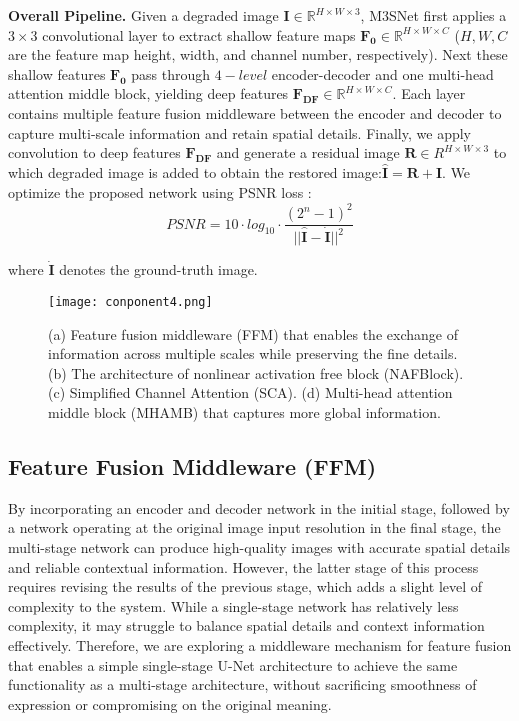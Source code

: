 \documentclass[sn-mathphys,Numbered]{sn-jnl}
\theoremstyle{thmstyleone}\newtheorem{theorem}{Theorem}\newtheorem{proposition}[theorem]{Proposition}
\theoremstyle{thmstyletwo}\newtheorem{example}{Example}\newtheorem{remark}{Remark}
\theoremstyle{thmstylethree}\newtheorem{definition}{Definition}
\begin{document}
\noindent\textbf{Overall Pipeline.} Given a degraded image $\mathbf{I} \in \mathbb R^{H \times W \times 3}$, M3SNet first applies a $3 \times 3$ convolutional layer to extract shallow feature maps $\mathbf{F_{0}} \in \mathbb R^{H \times W \times C}$ ($H, W, C$ are the feature map height, width, and channel number, respectively). Next these shallow features $\mathbf{F_{0}}$ pass through $4-level$ encoder-decoder and one multi-head attention middle block, yielding deep features $\mathbf{F_{DF}} \in \mathbb R^{H \times W \times C}$. Each layer contains multiple feature fusion middleware between the encoder and decoder to capture multi-scale information and retain spatial details. 
Finally, we apply convolution to deep  features $\mathbf{F_{DF}}$ and generate a residual image $\mathbf{R}\in  R^{H \times W \times 3}$ to which degraded image is added to obtain the restored image:$\mathbf{\hat{I}} = \mathbf{R} +\mathbf{I}$. We optimize the proposed network using PSNR loss : 
\begin{equation}
	\label{equ:01}
	PSNR = 10 \cdot log_{10} \cdot \frac{(2^n-1)^2}{||\mathbf{\hat{I}}-\mathbf{\dot I}||^2}
\end{equation}



\noindent where $\mathbf{\dot I}$ denotes the ground-truth image.
\begin{figure}[tb] \centering
	\texttt{[image: conponent4.png]}
	\caption{(a) Feature fusion middleware (FFM) that enables the exchange of information across multiple scales while preserving the fine details. (b) The architecture of nonlinear activation free block (NAFBlock). (c) Simplified Channel Attention (SCA). (d) Multi-head attention middle block (MHAMB) that  captures more global information.}
	\label{fig:03}
\end{figure}
\subsection{Feature Fusion Middleware (FFM)}
By incorporating an encoder and decoder network in the initial stage, followed by a network operating at the original image input resolution in the final stage, the multi-stage network can produce high-quality images with accurate spatial details and reliable contextual information. However, the latter stage of this process requires revising the results of the previous stage, which adds a slight level of complexity to the system. While a single-stage network has relatively less complexity, it may struggle to balance spatial details and context information effectively. Therefore, we are exploring a middleware mechanism for feature fusion that enables a simple single-stage U-Net architecture to achieve the same functionality as a multi-stage architecture, without sacrificing smoothness of expression or compromising on the original meaning.
\end{document}
